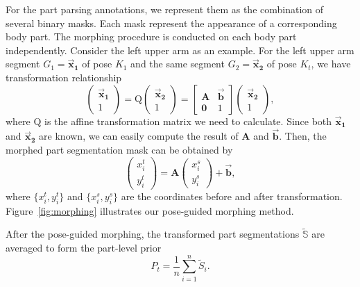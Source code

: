 \documentclass[10pt,twocolumn,letterpaper]{article}
\begin{document}
For the part parsing annotations, we represent them as the combination of several binary masks. Each mask represent the appearance of a corresponding body part. The morphing procedure is conducted on each body part independently. Consider the left upper arm as an example. For the left upper arm segment $G_{1} = \boldsymbol{\vec{x}_{1}}$ of pose $K_{1}$ and the same segment $G_{2} = \boldsymbol{\vec{x}_{2}}$ of pose $K_{t}$, we have transformation relationship
\begin{equation}\label{eq2}
\left(
\begin{matrix}
   \boldsymbol{\vec{x}_{1}} \\
   1
  \end{matrix}
  \right) =
\mathrm{Q}
\left(
\begin{matrix}
   \boldsymbol{\vec{x}_{2}} \\
   1
  \end{matrix}
\right)
=
\left[
  \begin{matrix}
  \boldsymbol{A} & \boldsymbol{\vec{b}}\\
  \boldsymbol{0} & 1
  \end{matrix}
\right]
\left(
\begin{matrix}
   \boldsymbol{\vec{x}_{2}} \\
   1
  \end{matrix}
\right),
\end{equation}
where $\mathrm{Q}$ is the affine transformation matrix we need to calculate. Since both $\boldsymbol{\vec{x}_{1}}$ and $\boldsymbol{\vec{x}_{2}}$ are known, we can easily compute the result of $\boldsymbol{A}$ and $\boldsymbol{\vec{b}}$. Then, the morphed part segmentation mask can be obtained by
\begin{equation}\label{eq1}
\left(
\begin{matrix}
   x_{i}^{t} \\
   y_{i}^{t}
  \end{matrix}
  \right) =
\boldsymbol{A}
\left(
\begin{matrix}
   x_{i}^{s} \\
   y_{i}^{s}
  \end{matrix}
\right)
+\boldsymbol{\vec{b}},
\end{equation}
where $\{x_{i}^{t},y_{i}^{t}\}$ and $\{x_{i}^{s},y_{i}^{s}\}$ are the coordinates before and after transformation. Figure~\ref{fig:morphing} illustrates our pose-guided morphing method.

After the pose-guided morphing, the transformed part segmentations $\mathbb{\widetilde{S}}$ are averaged to form the part-level prior
\begin{equation}
P_{t} = \frac{1}{n}\sum_{i=1}^{n}\widetilde{S}_{i}.\nonumber
\end{equation}
\end{document}
